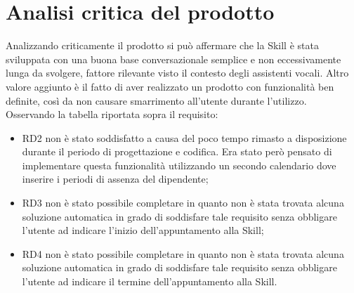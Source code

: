 \section{Analisi critica del prodotto}
Analizzando criticamente il prodotto si può affermare che la Skill è stata sviluppata con una buona base conversazionale semplice e non eccessivamente lunga da svolgere, fattore rilevante visto il contesto degli assistenti vocali. Altro valore aggiunto è il fatto di aver realizzato un prodotto con funzionalità ben definite, così da non causare smarrimento all'utente durante l'utilizzo.
\\[0.5cm]
Osservando la tabella riportata sopra il requisito:\\
\begin{itemize}
    \item RD2 non è stato soddisfatto a causa del poco tempo rimasto a disposizione durante il periodo di progettazione e codifica. Era stato però pensato di implementare questa funzionalità utilizzando un secondo calendario dove inserire i periodi di assenza del dipendente;
    \item RD3 non è stato possibile completare in quanto non è stata trovata alcuna soluzione automatica in grado di soddisfare tale requisito senza obbligare l'utente ad indicare l'inizio dell'appuntamento alla Skill;
	\item RD4 non è stato possibile completare in quanto non è stata trovata alcuna soluzione automatica in grado di soddisfare tale requisito senza obbligare l'utente ad indicare il termine dell'appuntamento alla Skill.
\end{itemize}

